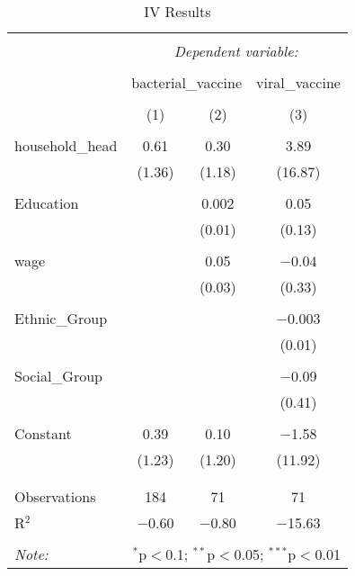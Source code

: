 \documentclass{article}
\begin{document}
\begin{table}[!htbp] \centering 
  \caption{IV Results} 
  \label{} 
\begin{tabular}{@{\extracolsep{5pt}}lccc} 
\\[-1.8ex]\hline 
\hline \\[-1.8ex] 
 & \multicolumn{3}{c}{\textit{Dependent variable:}} \\ 
\cline{2-4} 
\\[-1.8ex] & \multicolumn{2}{c}{bacterial\_vaccine} & viral\_vaccine \\ 
\\[-1.8ex] & (1) & (2) & (3)\\ 
\hline \\[-1.8ex] 
 household\_head & 0.61 & 0.30 & 3.89 \\ 
  & (1.36) & (1.18) & (16.87) \\ 
  & & & \\ 
 Education &  & 0.002 & 0.05 \\ 
  &  & (0.01) & (0.13) \\ 
  & & & \\ 
 wage &  & 0.05 & $-$0.04 \\ 
  &  & (0.03) & (0.33) \\ 
  & & & \\ 
 Ethnic\_Group &  &  & $-$0.003 \\ 
  &  &  & (0.01) \\ 
  & & & \\ 
 Social\_Group &  &  & $-$0.09 \\ 
  &  &  & (0.41) \\ 
  & & & \\ 
  Constant & 0.39 & 0.10 & $-$1.58 \\ 
  & (1.23) & (1.20) & (11.92) \\ 
  & & & \\ 
\hline \\[-1.8ex] 
Observations & 184 & 71 & 71 \\ 
R$^{2}$ & $-$0.60 & $-$0.80 & $-$15.63 \\ 
\hline 
\hline \\[-1.8ex] 
\textit{Note:}  & \multicolumn{3}{r}{$^{*}$p$<$0.1; $^{**}$p$<$0.05; $^{***}$p$<$0.01} \\ 
\end{tabular} 
\end{table} 
\end{document}

